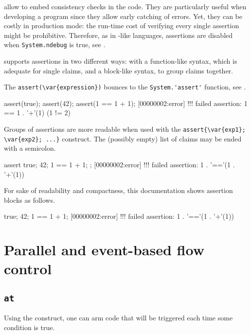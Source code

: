  allow to embed consistency checks in the
code.  They are particularly useful when developing a program since
they allow early catching of errors.  Yet, they can be costly in
production mode: the run-time cost of verifying every single assertion
might be prohibitive.  Therefore, as in \C-like languages, assertions
are disabled when \lstinline|System.ndebug| is true, see .

\us supports assertions in two different ways: with a function-like
syntax, which is adequate for single claims, and a block-like syntax,
to group claims together.

The \lstinline|assert(\var{expression})| bounces to the
\lstinline|System.'assert'| function, see .

\begin{urbiscript}[firstnumber=last]
assert(true);
assert(42);
assert(1 == 1 + 1);
[00000002:error] !!! failed assertion: 1 == 1 . '+'(1) (1 != 2)
\end{urbiscript}

Groups of assertions are more readable when used with the
\lstinline|assert{\var{exp1}; \var{exp2}; ...}| construct.  The
(possibly empty) list of claims may be ended with a semicolon.

\begin{urbiscript}[firstnumber=last]
assert
{
  true;
  42;
  1 == 1 + 1;
};
[00000002:error] !!! failed assertion: 1 . '=='(1 . '+'(1))
\end{urbiscript}

For sake of readability and compactness, this documentation shows
assertion blocks as follows.

\begin{urbiassert}[firstnumber=last]
true;
42;
1 == 1 + 1;
[00000002:error] !!! failed assertion: 1 . '=='(1 . '+'(1))
\end{urbiassert}


\section{Parallel and event-based flow control}

\subsection{\lstinline'at'}
\label{sec:lang:at}
Using the  construct, one can arm code that will be
triggered each time some condition is true.

